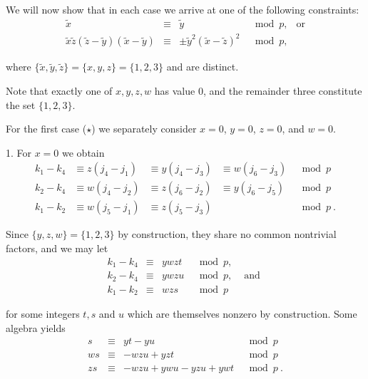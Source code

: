 We will now show that in each case we arrive at one of the following
constraints:
\begin{equation}\label{consti}
\begin{array}{ccccc}
\tilde{x} &\equiv& \tilde{y} &\mod p, &\text{or} \\
\tilde{x}\tilde{z}(\tilde{z}-\tilde{y})(\tilde{x}-\tilde{y})
&\equiv& \pm \tilde{y}^2(\tilde{x}-\tilde{z})^2  &\mod p, &{}
\end{array}
\end{equation}

where $\{\tilde{x},\tilde{y},\tilde{z}\} = \{x,y,z\}= \{1,2,3\}$ and
are distinct.

Note that exactly one of $x,y,z,w$ has value $0$, and the remainder
three constitute the set $\{1,2,3\}$.

For the first case ($\star$) we separately consider $x=0$, $y=0$,
$z=0$, and $w=0$.

1. For $x=0$ we obtain \begin{equation}\begin{array}{ccccc} k_1-k_4
&\equiv z(j_4-j_1)& \equiv y(j_4-j_3)& \equiv w(j_6-j_3) &\mod p
\\
k_2-k_4 &\equiv w(j_4-j_2) &\equiv  z(j_6-j_2) &\equiv y(j_6-j_5)
&\mod
p\\
k_1-k_2 &\equiv w(j_5-j_1) &\equiv z(j_5-j_3) & {}&\mod p~.
\end{array}\end{equation}

Since $\{y,z,w\}=\{1,2,3\}$ by construction, they share no common
nontrivial factors, and we may let
\begin{equation}\begin{array}{ccccc}k_1-k_4 &\equiv& ywzt &\mod p, &{} \\
k_2-k_4 &\equiv& ywzu &\mod p, &\text{ and }\\k_1-k_2 &\equiv& wzs
&\mod p&{}
\end{array}\end{equation}

for some integers $t,s$ and $u$ which are themselves nonzero by
construction. Some algebra yields
\begin{equation}\begin{array}{cccc}
s &\equiv &yt-yu &\mod p \\
ws &\equiv &-wzu +yzt &\mod p\\
zs &\equiv &-wzu +ywu -yzu +ywt &\mod p~.
\end{array}\end{equation}


